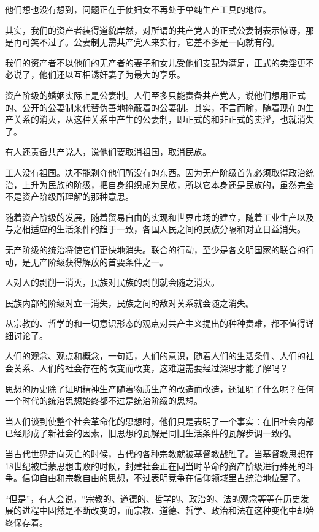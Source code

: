     他们想也没有想到，问题正在于使妇女不再处于单纯生产工具的地位。

    其实，我们的资产者装得道貌岸然，对所谓的共产党人的正式公妻制表示惊讶，那是再可笑不过了。公妻制无需共产党人来实行，它差不多是一向就有的。

    我们的资产者不以他们的无产者的妻子和女儿受他们支配为满足，正式的卖淫更不必说了，他们还以互相诱奸妻子为最大的享乐。

    资产阶级的婚姻实际上是公妻制。人们至多只能责备共产党人，说他们想用正式的、公开的公妻制来代替伪善地掩蔽着的公妻制。其实，不言而喻，随着现在的生产关系的消灭，从这种关系中产生的公妻制，即正式的和非正式的卖淫，也就消失了。

    有人还责备共产党人，说他们要取消祖国，取消民族。

    工人没有祖国。决不能剥夺他们所没有的东西。因为无产阶级首先必须取得政治统治，上升为民族的阶级，把自身组织成为民族，所以它本身还是民族的，虽然完全不是资产阶级所理解的那种意思。

    随着资产阶级的发展，随着贸易自由的实现和世界市场的建立，随着工业生产以及与之相适应的生活条件的趋于一致，各国人民之间的民族分隔和对立日益消失。

    无产阶级的统治将使它们更快地消失。联合的行动，至少是各文明国家的联合的行动，是无产阶级获得解放的首要条件之一。

    人对人的剥削一消灭，民族对民族的剥削就会随之消灭。

    民族内部的阶级对立一消失，民族之间的敌对关系就会随之消失。

    从宗教的、哲学的和一切意识形态的观点对共产主义提出的种种责难，都不值得详细讨论了。

    人们的观念、观点和概念，一句话，人们的意识，随着人们的生活条件、人们的社会关系、人们的社会存在的改变而改变，这难道需要经过深思才能了解吗？

    思想的历史除了证明精神生产随着物质生产的改造而改造，还证明了什么呢？任何一个时代的统治思想始终都不过是统治阶级的思想。

    当人们谈到使整个社会革命化的思想时，他们只是表明了一个事实：在旧社会内部已经形成了新社会的因素，旧思想的瓦解是同旧生活条件的瓦解步调一致的。

    当古代世界走向灭亡的时候，古代的各种宗教就被基督教战胜了。当基督教思想在18世纪被启蒙思想击败的时候，封建社会正在同当时革命的资产阶级进行殊死的斗争。信仰自由和宗教自由的思想，不过表明竞争在信仰领域里占统治地位罢了。

    “但是”，有人会说，“宗教的、道德的、哲学的、政治的、法的观念等等在历史发展的进程中固然是不断改变的，而宗教、道德、哲学、政治和法在这种变化中却始终保存着。

